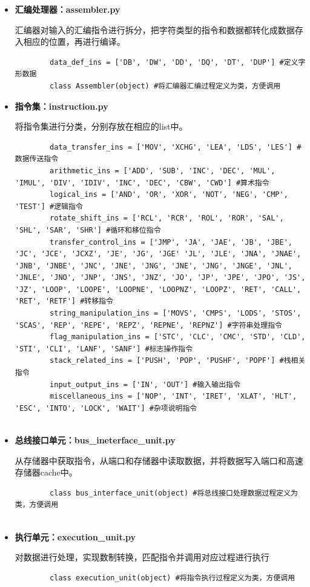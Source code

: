 \documentclass[UTF8,12pt]{article}
\begin{document}
\begin{itemize}
		\item \textbf{汇编处理器：assembler.py}
		
		汇编器对输入的汇编指令进行拆分，把字符类型的指令和数据都转化成数据存入相应的位置，再进行编译。
		
		\begin{lstlisting}
		data_def_ins = ['DB', 'DW', 'DD', 'DQ', 'DT', 'DUP'] #定义字形数据	
		class Assembler(object)	#将汇编器汇编过程定义为类，方便调用
		\end{lstlisting}
		
		\item \textbf{指令集：instruction.py}
		
		将指令集进行分类，分别存放在相应的list中。
		
		\begin{lstlisting}
		data_transfer_ins = ['MOV', 'XCHG', 'LEA', 'LDS', 'LES'] #数据传送指令
		arithmetic_ins = ['ADD', 'SUB', 'INC', 'DEC', 'MUL', 'IMUL', 'DIV', 'IDIV', 'INC', 'DEC', 'CBW', 'CWD'] #算术指令
		logical_ins = ['AND', 'OR', 'XOR', 'NOT', 'NEG', 'CMP', 'TEST'] #逻辑指令
		rotate_shift_ins = ['RCL', 'RCR', 'ROL', 'ROR', 'SAL', 'SHL', 'SAR', 'SHR'] #循环和移位指令
		transfer_control_ins = ['JMP', 'JA', 'JAE', 'JB', 'JBE', 'JC', 'JCE', 'JCXZ', 'JE', 'JG', 'JGE' 'JL', 'JLE', 'JNA', 'JNAE', 'JNB', 'JNBE', 'JNC', 'JNE', 'JNG', 'JNE', 'JNG', 'JNGE', 'JNL', 'JNLE', 'JNO', 'JNP', 'JNS', 'JNZ', 'JO', 'JP', 'JPE', 'JPO', 'JS', 'JZ', 'LOOP', 'LOOPE', 'LOOPNE', 'LOOPNZ', 'LOOPZ', 'RET', 'CALL', 'RET', 'RETF'] #转移指令
		string_manipulation_ins = ['MOVS', 'CMPS', 'LODS', 'STOS', 'SCAS', 'REP', 'REPE', 'REPZ', 'REPNE', 'REPNZ'] #字符串处理指令
		flag_manipulation_ins = ['STC', 'CLC', 'CMC', 'STD', 'CLD', 'STI', 'CLI', 'LANF', 'SANF'] #标志操作指令
		stack_related_ins = ['PUSH', 'POP', 'PUSHF', 'POPF'] #栈相关指令
		input_output_ins = ['IN', 'OUT'] #输入输出指令
		miscellaneous_ins = ['NOP', 'INT', 'IRET', 'XLAT', 'HLT', 'ESC', 'INTO', 'LOCK', 'WAIT'] #杂项说明指令
		
		\end{lstlisting}
		
		
		\item \textbf{总线接口单元：bus\_ineterface\_unit.py}
		
		从存储器中获取指令，从端口和存储器中读取数据，并将数据写入端口和高速存储器cache中。
		
		\begin{lstlisting}
		class bus_interface_unit(object) #将总线接口处理数据过程定义为类，方便调用
		
		\end{lstlisting}
		
		
		\item \textbf{执行单元：execution\_unit.py}
		
		对数据进行处理，实现数制转换，匹配指令并调用对应过程进行执行
		\begin{lstlisting}
		class execution_unit(object) #将指令执行过程定义为类，方便调用		
		\end{lstlisting}
		
	\end{itemize}
	
\end{document}
